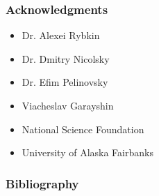 	\begin{frame}
		\frametitle{Acknowledgments}
	
		\begin{itemize}
		\item Dr. Alexei Rybkin  
		\item Dr. Dmitry Nicolsky
		\item Dr. Efim Pelinovsky
		\item Viacheslav Garayshin
		\item National Science Foundation
		\item University of Alaska Fairbanks
		\end{itemize}
		\end{frame}
	
		\begin{frame}[allowframebreaks]
		\nocite{*}
		\frametitle{Bibliography}
		
		
	\end{frame}
